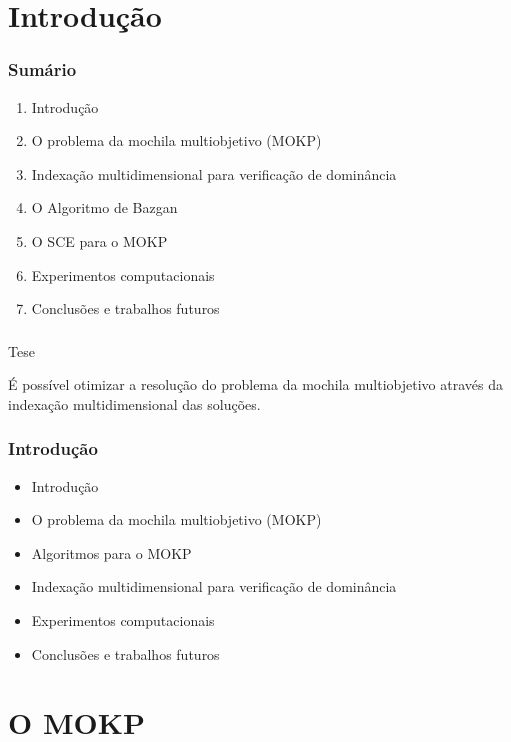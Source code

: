\documentclass[10pt,xcolor=table,fleqn]{beamer}
\author[]{ \textbf{Marcos Daniel Valadão Baroni} }
\date{31 de julho de 2018}
\begin{document}
\section{Introdução}

\begin{frame}
	\frametitle{Sumário}
	\begin{enumerate}
		\item Introdução
		\item O problema da mochila multiobjetivo (MOKP)
    \item Indexação multidimensional para verificação de dominância
    \item O Algoritmo de Bazgan
		\item O SCE para o MOKP
		\item Experimentos computacionais
		\item Conclusões e trabalhos futuros
	\end{enumerate}
\end{frame}

\begin{frame}
	\frametitle{}
  \begin{block}{Tese}
    \begin{center}
      É possível otimizar a resolução do problema da mochila
      multiobjetivo através da indexação multidimensional das soluções.
    \end{center}
  \end{block}
\end{frame}

\begin{frame}
	\frametitle{Introdução}
  \begin{itemize}
		\item Introdução
		\item O problema da mochila multiobjetivo (MOKP)
		\item Algoritmos para o MOKP
		\item Indexação multidimensional para verificação de dominância
		\item Experimentos computacionais
		\item Conclusões e trabalhos futuros
	\end{itemize}
\end{frame}

\section{O MOKP}
\end{document}
